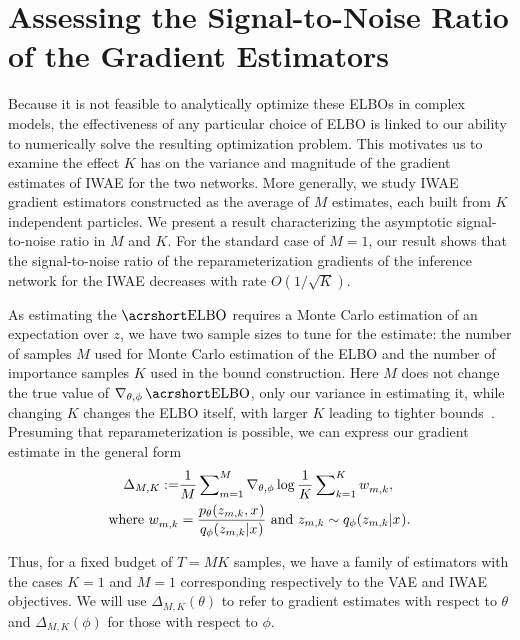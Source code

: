 
\section{Assessing the Signal-to-Noise Ratio of the Gradient Estimators}
\label{sec:snr}
Because it is not feasible to analytically optimize these \glspl{ELBO} in complex models,  the effectiveness of any particular choice of \gls{ELBO} is linked
to our ability to numerically solve the resulting optimization problem. This motivates us to examine 
the effect $K$ has on the variance and magnitude of the gradient estimates of \gls{IWAE} for the two networks. More generally, we study \gls{IWAE} gradient estimators constructed as the average of $M$ estimates, each built from $K$ independent particles. We present a result characterizing the asymptotic signal-to-noise ratio in $M$ and $K$. For the standard case of $M=1$, our result shows that the signal-to-noise ratio of the reparameterization gradients of the inference network for the \gls{IWAE} decreases with rate $O(1/\sqrt{K})$.

As estimating the $\ELBO$ requires a Monte Carlo estimation of an expectation over $z$, 
we have two sample sizes to tune for the estimate:
the number of samples $M$ used for Monte Carlo estimation of the \gls{ELBO} and the number of importance samples $K$ used
in the bound construction.  Here $M$ does not change the true value of
$\nabla_{\theta, \phi} \ELBO$, only our variance in estimating
it, while changing $K$ changes the \gls{ELBO} itself, with larger $K$ leading to tighter 
bounds~\citep{burda2016importance}.  Presuming that reparameterization
is possible, we can express our gradient estimate in the general form
\begin{align}
\label{eq:grad-est}
\Delta_{M,K} :=  &\frac{1}{M} \sum\nolimits_{m=1}^{M}
\nabla_{\theta, \phi} \log \frac{1}{K} \sum\nolimits_{k=1}^{K} w_{m,k}^{}, \\
\text{where} \, \, w_{m,k}^{} &= \frac{p_{\theta}(z_{m,k},x^{})}{q_{\phi}(z_{m,k} \lvert x^{})} \, \,
\text{and} \, \,z_{m,k} \sim q_{\phi}(z_{m,k} \lvert x^{}). \nonumber
\end{align}

Thus, for a fixed budget of $T = MK$ samples, we have a family of estimators with the cases $K=1$ and $M=1$
corresponding respectively to the \gls{VAE} and \gls{IWAE} objectives.
We will use ${\Delta}_{M,K} \left(\theta\right)$ to refer to gradient estimates with respect
to $\theta$ and ${\Delta}_{M,K} \left(\phi\right)$ for those with respect to
$\phi$. 

